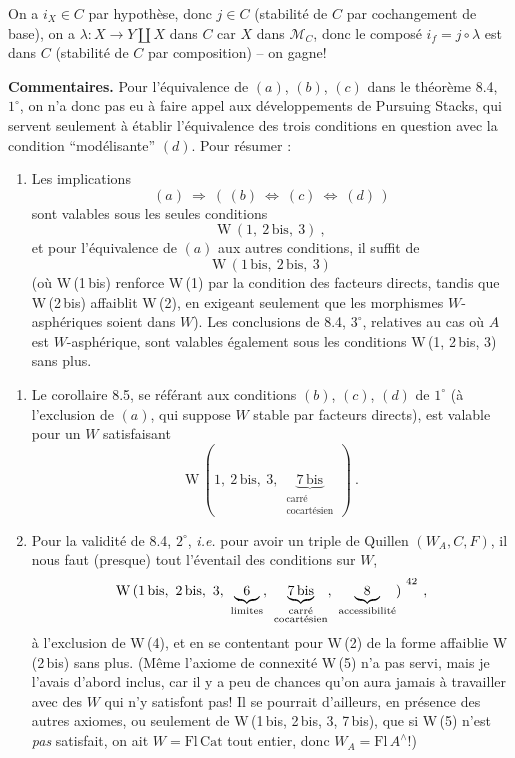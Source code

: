 \documentclass[11pt]{article}
\newcommand{\printedpage}[1]{\marginpar{\raggedright\footnotesize p.~#1}}
\newcommand{\msp}[1]{\marginpar{\raggedright\footnotesize [#1]}}
\begin{document}
\msp{page 114}

On a $i_X \in C$ par hypothèse, donc $j \in C$ (stabilité de $C$ par cochangement de base), on a $\lambda : X \longrightarrow Y \amalg X$ dans $C$ car $X$ dans $\mathcal{M}_C$, donc le composé $i_f = j \circ \lambda$ est dans $C$ (stabilité de $C$ par composition) – on gagne!

\textbf{Commentaires.} Pour l'équivalence de $(a)$, $(b)$, $(c)$ dans le théorème 8.4, $1^\circ$, on n'a donc pas eu à faire appel aux développements de Pursuing Stacks, qui servent seulement à établir l'équivalence des trois conditions en question avec la condition “modélisante” $(d)$. Pour résumer :
\begin{enumerate}[leftmargin=2.5em]
\item[$1^\circ$)] Les implications
\[
(a) \ \Longrightarrow\ (\,(b) \ \Longleftrightarrow\ (c) \ \Longleftrightarrow\ (d)\,)
\]
sont valables sous les seules conditions
\[
\mathrm{W}\,(1,\ 2\,\mathrm{bis},\ 3)\ ,
\]
et pour l'équivalence de $(a)$ aux autres conditions, il suffit de
\[
\mathrm{W}\,(1\,\mathrm{bis},\ 2\,\mathrm{bis},\ 3)
\]
(où W\,(1\,bis) renforce W\,(1) par la condition des facteurs directs, tandis que W\,(2\,bis) affaiblit W\,(2), en exigeant seulement que les morphismes $W$-asphériques soient dans $W$). Les conclusions de 8.4, $3^\circ$, relatives au cas où $A$ est $W$-asphérique, sont valables également sous les conditions W\,(1, 2\,bis, 3) sans plus.
\end{enumerate}

\msp{page 115}

\begin{enumerate}[leftmargin=2.5em]
\item[$2^\circ$)] Le corollaire 8.5, se référant aux conditions $(b)$, $(c)$, $(d)$ de $1^\circ$ (à l'exclusion de $(a)$, qui suppose $W$ stable par facteurs directs), est valable pour un $W$ satisfaisant
\[
\mathrm{W}\,(1,\ 2\,\mathrm{bis},\ 3,\ \underbrace{7\,\mathrm{bis}}_{\substack{\text{carré}\\ \text{cocartésien}}}\,)\ .
\]
\printedpage{63}
\item[$3^\circ$)] Pour la validité de 8.4, $2^\circ$, \textit{i.e.} pour avoir un triple de Quillen $(W_A,C,F)$, il nous faut (presque) tout l'éventail des conditions sur $W$,
\[
\mathrm{W}\,(1\,\mathrm{bis},\ 2\,\mathrm{bis},\ 3,\ \underbrace{\ 6\ }_{\text{limites}},\ \underbrace{7\,\mathrm{bis}}_{\substack{\text{carré}\\ \text{cocartésien}}},\ \underbrace{\ 8\ }_{\text{accessibilité}})\ ^{\footnotemark[42]}\ ,
\]
à l'exclusion de W\,(4), et en se contentant pour W\,(2) de la forme affaiblie W\,(2\,bis) sans plus. (Même l'axiome de connexité W\,(5) n'a pas servi, mais je l'avais d'abord inclus, car il y a peu de chances qu'on aura jamais à travailler avec des $W$ qui n'y satisfont pas! Il se pourrait d'ailleurs, en présence des autres axiomes, ou seulement de W\,(1\,bis, 2\,bis, 3, 7\,bis), que si W\,(5) n'est \textit{pas} satisfait, on ait $W = \mathrm{Fl}\,\mathrm{Cat}$ tout entier, donc $W_A = \mathrm{Fl}\,A^\wedge$!)
\end{enumerate}
\end{document}
